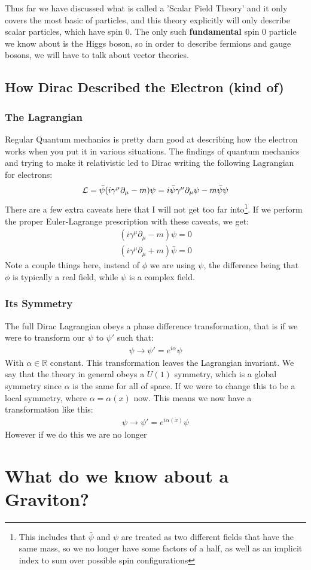 \documentclass[12pt]{article}
\renewcommand{\L}{\mathcal{L}}
\newcommand{\D}{\partial}
\newcommand{\psib}{\bar{\psi}}
\begin{document}
Thus far we have discussed what is called a 'Scalar Field Theory' and it only covers the most basic of particles, and this theory explicitly will only describe scalar particles, which have spin 0. The only such \textbf{fundamental} spin 0 particle we know about is the Higgs boson, so in order to describe fermions and gauge bosons, we will have to talk about vector theories.

\subsection{How Dirac Described the Electron (kind of)}

\subsubsection{The Lagrangian}
Regular Quantum mechanics is pretty darn good at describing how the electron works when you put it in various situations. The findings of quantum mechanics and trying to make it relativistic led to Dirac writing the following Lagrangian for electrons:
\begin{align*}
  \L=\psib\qty(i\gamma^\mu\D_\mu-m)\psi=i\psib\gamma^\mu\D_\mu\psi-m\psib\psi
\end{align*}
There are a few extra caveats here that I will not get too far into\footnote{This includes that $\psib$ and $\psi$ are treated as two different fields that have the same mass, so we no longer have some factors of a half, as well as an implicit index to sum over possible spin configurations}. If we perform the proper Euler-Lagrange prescription with these caveats, we get:
\begin{align*}
  (i\gamma^\mu\D_\mu-m)\psi=0\\
  (i\gamma^\mu\D_\mu+m)\psib=0
\end{align*}
Note a couple things here, instead of $\phi$ we are using $\psi$, the difference being that $\phi$ is typically a real field, while $\psi$ is a complex field.
\subsubsection{Its Symmetry}
The full Dirac Lagrangian obeys a phase difference transformation, that is if we were to transform our $\psi$ to $\psi'$ such that:
\begin{align*}
  \psi\to\psi'=e^{i\alpha}\psi
\end{align*}
With $\alpha\in\mathbb{R}$ constant. This transformation leaves the Lagrangian invariant. We say that the theory in general obeys a $U(1)$ symmetry, which is a global symmetry since $\alpha$ is the same for all of space. If we were to change this to be a local symmetry, where $\alpha=\alpha(x)$ now. This means we now have a transformation like this:
\begin{align*}
  \psi\to\psi'=e^{i\alpha(x)}\psi
\end{align*}
However if we do this we are no longer
\section{What do we know about a Graviton?}
\end{document}
